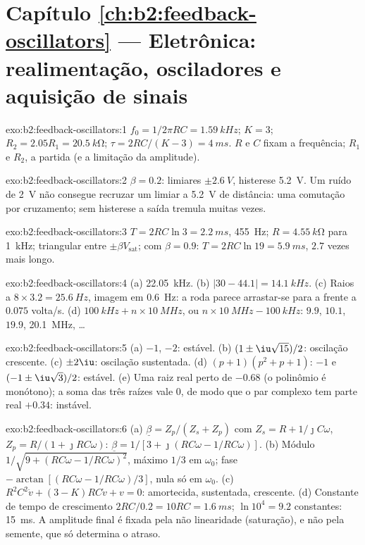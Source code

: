 \section*{Capítulo \ref{ch:b2:feedback-oscillators} --- Eletrônica: realimentação, osciladores e aquisição de sinais}

\begin{solution}{exo:b2:feedback-oscillators:1}
$f_0 = 1/2\pi RC = \qty{1.59}{kHz}$; $K = 3$; $R_2 = 2.05R_1 = \qty{20.5}{k\ohm}$;
$\tau = 2RC/(K - 3) = \qty{4}{ms}$. $R$ e $C$ fixam a frequência; $R_1$ e $R_2$, a
partida (e a limitação da amplitude).
\end{solution}

\begin{solution}{exo:b2:feedback-oscillators:2}
$\beta = 0.2$: limiares $\pm\qty{2.6}{V}$, histerese \qty{5.2}{V}. Um ruído de
\qty{2}{V} não consegue recruzar um limiar a \qty{5.2}{V} de distância: uma comutação por
cruzamento; sem histerese a saída tremula muitas vezes.
\end{solution}

\begin{solution}{exo:b2:feedback-oscillators:3}
$T = 2RC\ln3 = \qty{2.2}{ms}$, \qty{455}{Hz}; $R = \qty{4.55}{k\ohm}$ para \qty{1}{kHz};
triangular entre $\pm\beta V_{\text{sat}}$; com $\beta = 0.9$: $T = 2RC\ln19 = \qty{5.9}{ms}$,
$2.7$ vezes mais longo.
\end{solution}

\begin{solution}{exo:b2:feedback-oscillators:4}
(a) \qty{22.05}{kHz}. (b) $|30 - 44.1| = \qty{14.1}{kHz}$. (c) Raios a $8 \times 3.2 =
\qty{25.6}{Hz}$, imagem em \qty{0.6}{Hz}: a roda parece arrastar-se para a frente a
$0.075$ volta/s. (d) $\qty{100}{kHz} + n \times \qty{10}{MHz}$, ou $n \times \qty{10}{MHz} -
\qty{100}{kHz}$: $9.9$, $10.1$, $19.9$, \qty{20.1}{MHz}, \dots
\end{solution}

\begin{solution}{exo:b2:feedback-oscillators:5}
(a) $-1$, $-2$: estável. (b) $(1 \pm \iu\sqrt{15})/2$: oscilação crescente.
(c) $\pm2\iu$: oscilação sustentada. (d) $(p + 1)(p^2 + p + 1)$: $-1$ e
$(-1 \pm \iu\sqrt3)/2$: estável. (e) Uma raiz real perto de $-0.68$ (o
polinômio é monótono); a soma das três raízes vale $0$, de modo que o
par complexo tem parte real $+0.34$: instável.
\end{solution}

\begin{solution}{exo:b2:feedback-oscillators:6}
(a) $\underline\beta = Z_p/(Z_s + Z_p)$ com $Z_s = R + 1/\jmath C\omega$, $Z_p = R/(1 +
\jmath RC\omega)$: $\underline\beta = 1/[3 + \jmath(RC\omega - 1/RC\omega)]$. (b) Módulo
$1/\sqrt{9 + (RC\omega - 1/RC\omega)^2}$, máximo $1/3$ em $\omega_0$; fase $-\arctan
[(RC\omega - 1/RC\omega)/3]$, nula só em $\omega_0$. (c) $R^2C^2\ddot v + (3 - K)RC
\dot v + v = 0$: amortecida, sustentada, crescente. (d) Constante de tempo de crescimento
$2RC/0.2 = 10RC = \qty{1.6}{ms}$; $\ln10^4 = 9.2$ constantes: \qty{15}{ms}. A
amplitude final é fixada pela não linearidade (saturação), e não pela
semente, que só determina o atraso.
\end{solution}

